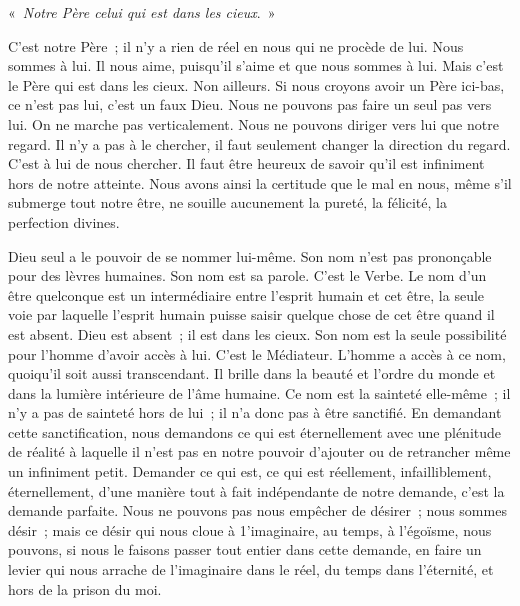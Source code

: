 \documentclass[french,twoside]{book} %
\newenvironment{quoteblock}%
  {\begin{quoting}}
  {\end{quoting}}
\newenvironment{quotebar}{%
    \def\FrameCommand{{\color{rubric!10!}\vrule width 0.5em} \hspace{0.9em}}%
    \def\OuterFrameSep{\itemsep} %
    \MakeFramed {\advance\hsize-\width \FrameRestore}
  }%
  {%
    \endMakeFramed
  }
\renewenvironment{quoteblock}%
  {%
    \savenotes
    \setstretch{0.9}
    \normalfont
    \begin{quotebar}
  }
  {%
    \end{quotebar}
    \spewnotes
  }
\begin{document}
\begin{quoteblock}
  « {\itshape Notre Père celui qui est dans les cieux}. »
 \end{quoteblock}

\noindent C'est notre Père ; il n'y a rien de réel en nous qui ne procède de lui. Nous sommes à lui. Il nous aime, puisqu'il s'aime et que nous sommes à lui. Mais c'est le Père qui est dans les cieux. Non ailleurs. Si nous croyons avoir un Père ici-bas, ce n'est pas lui, c'est un faux Dieu. Nous ne pouvons pas faire un seul pas vers lui. On ne marche pas verticalement. Nous ne pouvons diriger vers lui que notre regard. Il n'y a pas à le chercher, il faut seulement changer la direction du regard. C'est à lui de nous chercher. Il faut être heureux de savoir qu'il est infiniment hors de notre atteinte. Nous avons ainsi la certitude que le mal en nous, même s'il submerge tout notre être, ne souille aucunement la pureté, la félicité, la perfection divines.\par

\begin{quoteblock}
 \end{quoteblock}

\noindent Dieu seul a le pouvoir de se nommer lui-même. Son nom n'est pas prononçable pour des lèvres humaines. Son nom est sa parole. C'est le Verbe. Le nom d'un être quelconque est un intermédiaire entre l'esprit humain et cet être, la seule voie par laquelle l'esprit humain puisse saisir quelque chose de cet être quand il est absent. Dieu est absent ; il est dans les cieux. Son nom est la seule possibilité pour l'homme d'avoir accès à lui. C'est le Médiateur. L'homme a accès à ce nom, quoiqu'il soit aussi transcendant. Il brille dans la beauté et l'ordre du monde et dans la lumière intérieure de l'âme humaine. Ce nom est la sainteté elle-même ; il n'y a pas de sainteté hors de lui ; il n'a donc pas à être sanctifié. En demandant cette sanctification, nous demandons ce qui est éternellement avec une plénitude de réalité à laquelle il n'est pas en notre pouvoir d'ajouter ou de retrancher même un infiniment petit. Demander ce qui est, ce qui est réellement, infailliblement, éternellement, d'une manière tout à fait indépendante de notre demande, c'est la demande parfaite. Nous ne pouvons pas nous empêcher de désirer ; nous sommes désir ; mais ce désir qui nous cloue à 1'imaginaire, au temps, à l'égoïsme, nous pouvons, si nous le faisons passer tout entier dans cette demande, en faire un levier qui nous arrache de l'imaginaire dans le réel, du temps dans l'éternité, et hors de la prison du moi.\par
\end{document}

